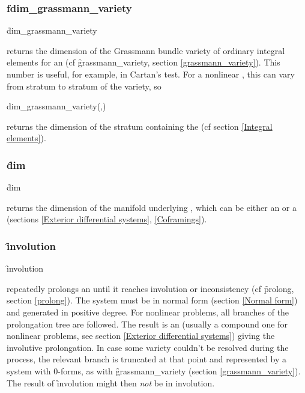 \subsubsection{f{dim\_grassmann\_variety}}
\label{dim_grassmann_variety}

\hypertarget{operator:DIM_GRASSMANN_VARIETY}{}
\begin{syntax}
	\f{dim\_grassmann\_variety} 
\end{syntax}
returns the dimension of the Grassmann bundle variety of ordinary integral
elements for an  (cf \f{grassmann\_variety}, section
\ref{grassmann_variety}). This number is useful, for example, in Cartan's
test. For a nonlinear , this can vary from stratum to stratum of
the variety, so
\begin{syntax}
	dim\_grassmann\_variety(,)
\end{syntax}
returns the dimension of the stratum containing the 
(cf section \ref{Integral elements}).

\subsubsection{\f{dim}}
\label{dim}

\hypertarget{operator:EDS_DIM}{}
\begin{syntax}
	\f{dim} 
\end{syntax}
returns the dimension of the manifold underlying ,
which can be either an  or a  (sections \ref{Exterior
differential systems}, \ref{Coframings}).

\subsubsection{\f{involution}}
\label{involution}

\hypertarget{operator:INVOLUTION}{}
\begin{syntax}
	\f{involution} 
\end{syntax}
repeatedly prolongs an  until it reaches involution or
inconsistency (cf \f{prolong}, section \ref{prolong}). The system must be
in normal form (section \ref{Normal form}) and generated in positive
degree. For nonlinear problems, all branches of the prolongation tree are
followed. The result is an  (usually a compound one for
nonlinear problems, see section \ref{Exterior differential systems})
giving the involutive prolongation. In case some variety couldn't be
resolved during the process, the relevant branch is truncated at that point
and represented by a system with 0-forms, as with \f{grassmann\_variety}
(section \ref{grassmann_variety}). The result of \f{involution} might then
\emph{not} be in involution.


